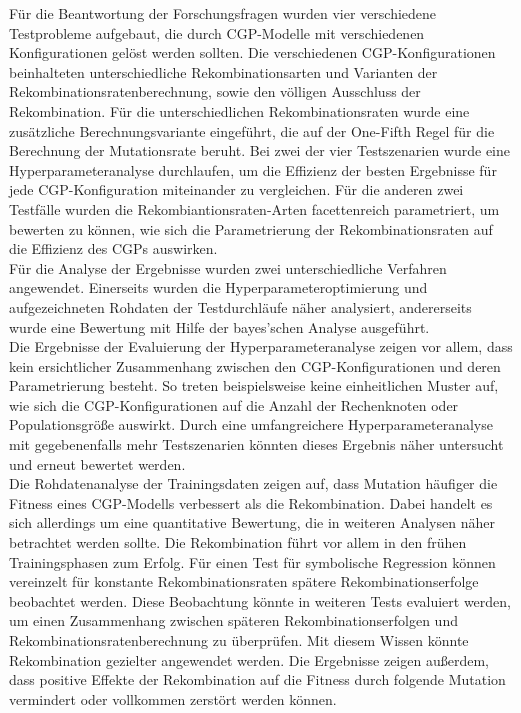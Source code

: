 Für die Beantwortung der Forschungsfragen wurden vier verschiedene Testprobleme aufgebaut, die durch CGP-Modelle mit verschiedenen Konfigurationen gelöst werden sollten.
Die verschiedenen CGP-Konfigurationen beinhalteten unterschiedliche Rekombinationsarten und Varianten der Rekombinationsratenberechnung, sowie den völligen Ausschluss der Rekombination.
Für die unterschiedlichen Rekombinationsraten wurde eine zusätzliche Berechnungsvariante eingeführt, die auf der One-Fifth Regel für die Berechnung der Mutationsrate beruht.
Bei zwei der vier Testszenarien wurde eine Hyperparameteranalyse durchlaufen, um die Effizienz der besten Ergebnisse für jede CGP-Konfiguration miteinander zu vergleichen.
Für die anderen zwei Testfälle wurden die Rekombiantionsraten-Arten facettenreich parametriert, um bewerten zu können, wie sich die Parametrierung der Rekombinationsraten auf die Effizienz des CGPs auswirken.\\
Für die Analyse der Ergebnisse wurden zwei unterschiedliche Verfahren angewendet.
Einerseits wurden die Hyperparameteroptimierung und aufgezeichneten Rohdaten der Testdurchläufe näher analysiert, andererseits wurde eine Bewertung mit Hilfe der bayes'schen Analyse ausgeführt.\\
Die Ergebnisse der Evaluierung der Hyperparameteranalyse zeigen vor allem, dass kein ersichtlicher Zusammenhang zwischen den CGP-Konfigurationen und deren Parametrierung besteht.
So treten beispielsweise keine einheitlichen Muster auf, wie sich die CGP-Konfigurationen auf die Anzahl der Rechenknoten oder Populationsgröße auswirkt.
Durch eine umfangreichere Hyperparameteranalyse mit gegebenenfalls mehr Testszenarien könnten dieses Ergebnis näher untersucht und erneut bewertet werden.\\
Die Rohdatenanalyse der Trainingsdaten zeigen auf, dass Mutation häufiger die Fitness eines CGP-Modells verbessert als die Rekombination.
Dabei handelt es sich allerdings um eine quantitative Bewertung, die in weiteren Analysen näher betrachtet werden sollte.
Die Rekombination führt vor allem in den frühen Trainingsphasen zum Erfolg.
Für einen Test für symbolische Regression können vereinzelt für konstante Rekombinationsraten spätere Rekombinationserfolge beobachtet werden.
Diese Beobachtung könnte in weiteren Tests evaluiert werden, um einen Zusammenhang zwischen späteren Rekombinationserfolgen und Rekombinationsratenberechnung zu überprüfen.
Mit diesem Wissen könnte Rekombination gezielter angewendet werden.
Die Ergebnisse zeigen außerdem, dass positive Effekte der Rekombination auf die Fitness durch folgende Mutation vermindert oder vollkommen zerstört werden können.
